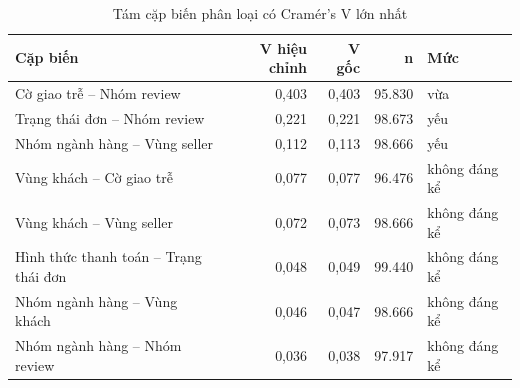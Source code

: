 \begin{table}[htbp]\centering\scriptsize\caption{Tám cặp biến phân loại có Cramér's V lớn nhất}\label{tab:cramer-v}
\begin{tabular}{p{6.2cm}rrrl}\toprule
\textbf{Cặp biến} & \textbf{V hiệu chỉnh} & \textbf{V gốc} & \textbf{n} & \textbf{Mức}\\\midrule
Cờ giao trễ -- Nhóm review & 0,403 & 0,403 & 95.830 & vừa\\
Trạng thái đơn -- Nhóm review & 0,221 & 0,221 & 98.673 & yếu\\
Nhóm ngành hàng -- Vùng seller & 0,112 & 0,113 & 98.666 & yếu\\
Vùng khách -- Cờ giao trễ & 0,077 & 0,077 & 96.476 & không đáng kể\\
Vùng khách -- Vùng seller & 0,072 & 0,073 & 98.666 & không đáng kể\\
Hình thức thanh toán -- Trạng thái đơn & 0,048 & 0,049 & 99.440 & không đáng kể\\
Nhóm ngành hàng -- Vùng khách & 0,046 & 0,047 & 98.666 & không đáng kể\\
Nhóm ngành hàng -- Nhóm review & 0,036 & 0,038 & 97.917 & không đáng kể\\
\bottomrule\end{tabular}\end{table}
